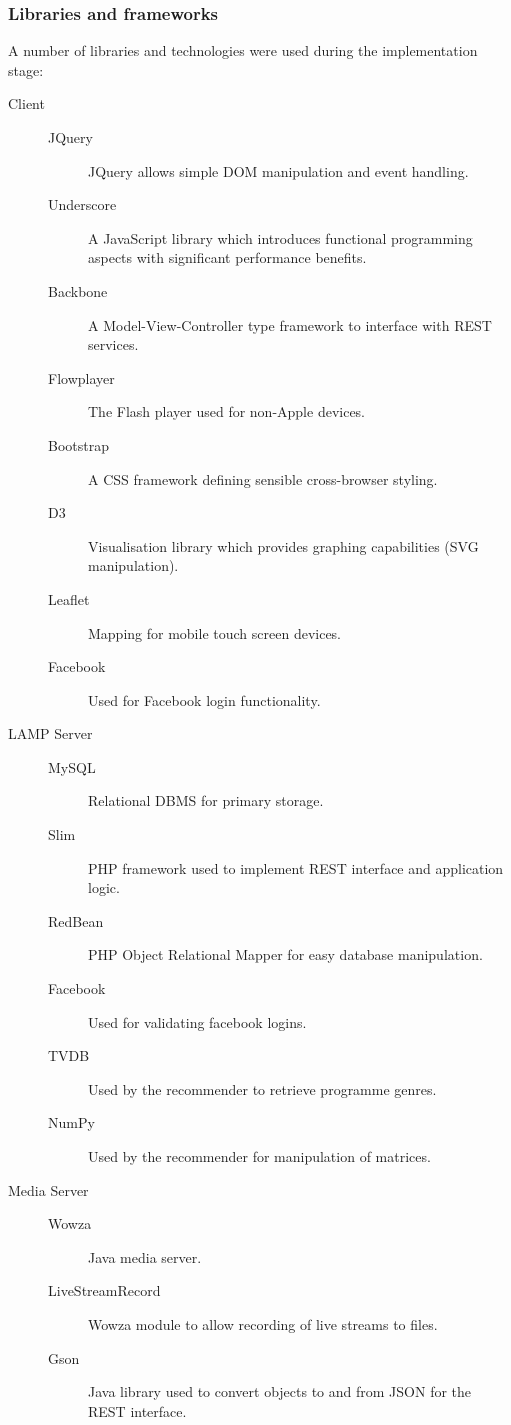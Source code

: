\subsubsection{Libraries and frameworks}

A number of libraries and technologies were used during the implementation stage:

\begin{description}
	\item[Client] \hfill
		\begin{description}
			\item[JQuery] JQuery allows simple DOM manipulation and event handling.
			\item[Underscore] A JavaScript library which introduces functional programming aspects with significant performance benefits.
			\item[Backbone] A Model-View-Controller type framework to interface with REST services.
			\item[Flowplayer] The Flash player used for non-Apple devices.
			\item[Bootstrap] A CSS framework defining sensible cross-browser styling.
			\item[D3] Visualisation library which provides graphing capabilities (SVG manipulation).
			\item[Leaflet] Mapping for mobile touch screen devices.
			\item[Facebook] Used for Facebook login functionality.
		\end{description}
	\item[LAMP Server] \hfill
		\begin{description}
			\item[MySQL] Relational DBMS for primary storage.
			\item[Slim] PHP framework used to implement REST interface and application logic.
			\item[RedBean] PHP Object Relational Mapper for easy database manipulation.
			\item[Facebook] Used for validating facebook logins.
			\item[TVDB] Used by the recommender to retrieve programme genres.
			\item[NumPy] Used by the recommender for manipulation of matrices.
		\end{description}
	\item[Media Server] \hfill
		\begin{description}
			\item[Wowza] Java media server.
			\item[LiveStreamRecord] Wowza module to allow recording of live streams to files.
			\item[Gson] Java library used to convert objects to and from JSON for the REST interface.
		\end{description}
\end{description}


